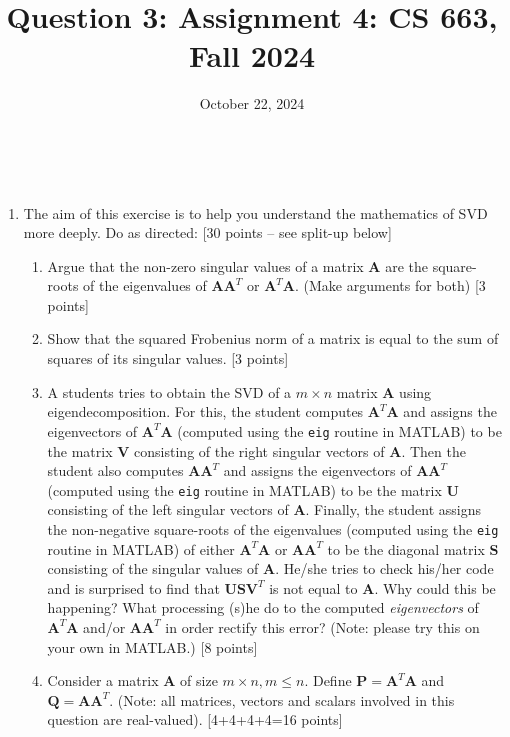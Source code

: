 \documentclass{article}
\title{Question 3: Assignment 4: CS 663, Fall 2024}
\author{
\IEEEauthorblockN{
    \begin{tabular}{cccc}
        \begin{minipage}[t]{0.23\textwidth}
            \centering
            Amitesh Shekhar\\
            IIT Bombay\\
            22b0014@iitb.ac.in
        \end{minipage} & 
        \begin{minipage}[t]{0.23\textwidth}
            \centering
            Anupam Rawat\\
            IIT Bombay\\
            22b3982@iitb.ac.in
        \end{minipage} & 
        \begin{minipage}[t]{0.23\textwidth}
            \centering
            Toshan Achintya Golla\\
            IIT Bombay\\
            22b2234@iitb.ac.in
        \end{minipage} \\
        \\ 
    \end{tabular}
}
}
\date{October 22, 2024}
\begin{document}
\maketitle

\\

\begin{enumerate}
    \item The aim of this exercise is to help you understand the mathematics of SVD more deeply. Do as directed: \textsf{[30 points -- see split-up below]}
    
    \begin{enumerate}
        \item Argue that the non-zero singular values of a matrix $\boldsymbol{A}$ are the square-roots of the eigenvalues of $\boldsymbol{AA}^T$ or $\boldsymbol{A}^T\boldsymbol{A}$. (Make arguments for both) \textsf{[3 points]}
        \item Show that the squared Frobenius norm of a matrix is equal to the sum of squares of its singular values. \textsf{[3 points]}
        \item A students tries to obtain the SVD of a $m \times n$ matrix $\boldsymbol{A}$ using eigendecomposition. For this, the student computes $\boldsymbol{A}^T \boldsymbol{A}$ and assigns the eigenvectors of $\boldsymbol{A}^T \boldsymbol{A}$ (computed using the \texttt{eig} routine in MATLAB) to be the matrix $\boldsymbol{V}$ consisting of the right singular vectors of $\boldsymbol{A}$. Then the student also computes $\boldsymbol{A} \boldsymbol{A}^T$ and assigns the eigenvectors of $\boldsymbol{A}\boldsymbol{A}^T$ (computed using the \texttt{eig} routine in MATLAB) to be the matrix $\boldsymbol{U}$ consisting of the left singular vectors of $\boldsymbol{A}$. Finally, the student assigns the non-negative square-roots of the eigenvalues (computed using the \texttt{eig} routine in MATLAB) of either $\boldsymbol{A}^T \boldsymbol{A}$ or $\boldsymbol{A} \boldsymbol{A}^T$ to be the diagonal matrix $\boldsymbol{S}$ consisting of the singular values of $\boldsymbol{A}$. He/she tries to check his/her code and is surprised to find that $\boldsymbol{USV}^T$ is not equal to $\boldsymbol{A}$. Why could this be happening? What processing (s)he do to the computed \emph{eigenvectors} of $\boldsymbol{A}^T \boldsymbol{A}$ and/or $\boldsymbol{A}\boldsymbol{A}^T$ in order rectify this error? (Note: please try this on your own in MATLAB.) \textsf{[8 points]}
        
        \item Consider a matrix $\boldsymbol{A}$ of size $m \times n, m \leq n$. Define $\boldsymbol{P} = \boldsymbol{A}^T \boldsymbol{A}$ and $\boldsymbol{Q} = \boldsymbol{A}\boldsymbol{A}^T$. (Note: all matrices, vectors and scalars involved in this question are real-valued). \textsf{[4+4+4+4=16 points]}


\end{enumerate}
\end{enumerate}
\end{document}
